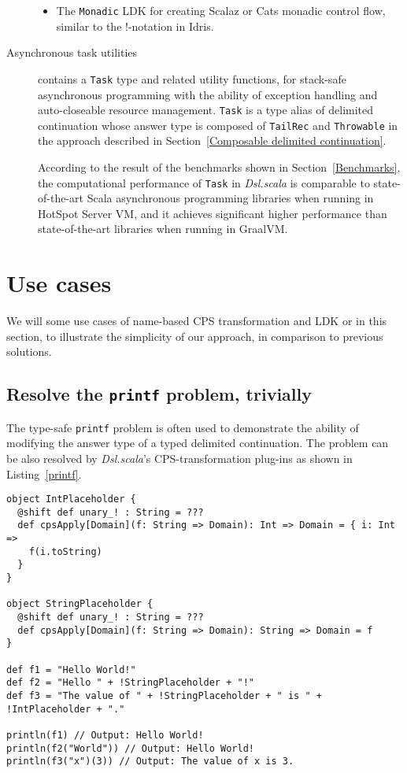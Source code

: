 \begin{description}
\begin{itemize}
    \item The \lstinline{Monadic} LDK for creating Scalaz \cite{kenji2017scalaz} or Cats \cite{typelevel2017cats} monadic control flow, similar to the !-notation in Idris\cite{brady2013idris}.
  \end{itemize}
  \item[Asynchronous task utilities] contains a \lstinline{Task} type and related utility functions, for stack-safe asynchronous programming with the ability of exception handling and auto-closeable resource management. \lstinline{Task} is a type alias of delimited continuation whose answer type is composed of \lstinline{TailRec} and \lstinline{Throwable} in the approach described in Section~\ref{Composable delimited continuation}.

  According to the result of the benchmarks shown in Section~\ref{Benchmarks}, the computational performance of \lstinline{Task} in \textit{Dsl.scala} is comparable to state-of-the-art Scala asynchronous programming libraries when running in HotSpot Server VM, and it achieves significant higher performance than state-of-the-art libraries when running in GraalVM.
\end{description}

\section{Use cases}

We will some use cases of name-based CPS transformation and LDK or  in this section, to illustrate the simplicity of our approach, in comparison to previous solutions.

\subsection{Resolve the \lstinline{printf} problem, trivially}\label{resolve-printf-problem}

The type-safe \lstinline{printf} problem \cite{danvy1998functional} is often used to demonstrate the ability of modifying the answer type of a typed delimited continuation. The problem can be also resolved by \textit{Dsl.scala}'s CPS-transformation plug-ins as shown in Listing~\ref{printf}.

\begin{lstlisting}[caption={A solution of the type-safe \lstinline{printf} problem in \textit{Dsl.scala}},label={printf}]
object IntPlaceholder {
  @shift def unary_! : String = ???
  def cpsApply[Domain](f: String => Domain): Int => Domain = { i: Int =>
    f(i.toString)
  }
}

object StringPlaceholder {
  @shift def unary_! : String = ???
  def cpsApply[Domain](f: String => Domain): String => Domain = f
}

def f1 = "Hello World!"
def f2 = "Hello " + !StringPlaceholder + "!"
def f3 = "The value of " + !StringPlaceholder + " is " + !IntPlaceholder + "."

println(f1) // Output: Hello World!
println(f2("World")) // Output: Hello World!
println(f3("x")(3)) // Output: The value of x is 3.
\end{lstlisting}

